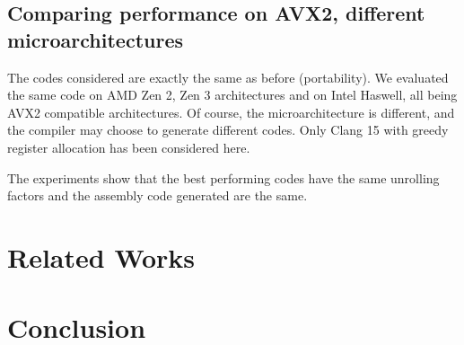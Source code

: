\documentclass{article}
\begin{document}
\subsection{Comparing performance on AVX2, different microarchitectures}
The codes considered are exactly the same as before (portability). We evaluated the same code on AMD Zen 2, Zen 3 architectures and on Intel Haswell, all being AVX2 compatible architectures. Of course, the microarchitecture is different, and the compiler may choose to generate different codes. Only Clang 15 with greedy register allocation has been considered here. 

The experiments show that the best performing codes have the same unrolling factors and the assembly code generated are the same. 




\section{Related Works}
\section{Conclusion}
\label{sec:conclusion}


\end{document}
